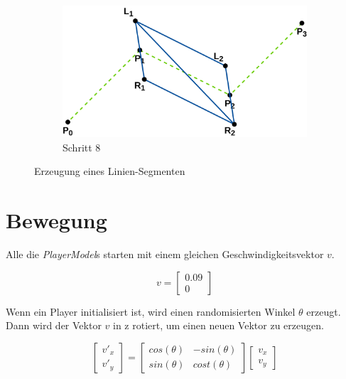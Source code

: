 \documentclass[doktyp=studarbeit]{TUBAFarbeiten}
\begin{document}
\begin{figure}[!htb]
\begin{subfigure}[b]{0.35\textwidth}
        \includegraphics[width=1\linewidth]{Schlangenlinie-8.png}
        \caption{Schritt 8}
    \end{subfigure}
    \caption{Erzeugung eines Linien-Segmenten}
	\label{fig:line}
\end{figure}

\section{Bewegung}

Alle die \textit{PlayerModel}s starten mit einem gleichen 
Geschwindigkeitsvektor $v$.

\begin{equation}
    v =
    \begin{bmatrix}
        0.09    \\
        0
    \end{bmatrix}
\end{equation}

Wenn ein Player initialisiert ist, wird einen randomisierten Winkel $\theta$ 
erzeugt. Dann wird der Vektor $v$ in z rotiert, um einen neuen Vektor zu 
erzeugen.

\begin{equation}
    \begin{bmatrix}
        v'_{x} \\
        v'_{y}     
    \end{bmatrix}
    =
    \begin{bmatrix}
        cos(\theta) & -sin(\theta) \\
        sin(\theta) & cost(\theta)
    \end{bmatrix}
    \begin{bmatrix}
        v_{x} \\
        v_{y}
    \end{bmatrix}
    \label{eq:rotation}
\end{equation}
\end{document}
